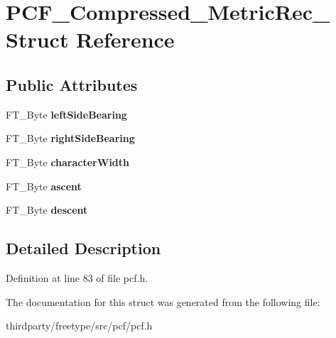 \hypertarget{struct_p_c_f___compressed___metric_rec__}{}\section{P\+C\+F\+\_\+\+Compressed\+\_\+\+Metric\+Rec\+\_\+ Struct Reference}
\label{struct_p_c_f___compressed___metric_rec__}
\subsection*{Public Attributes}
\begin{DoxyCompactItemize}
\item 
\mbox{\label{struct_p_c_f___compressed___metric_rec___aa755334ae0a81cf54129fc19af69024e}} 
F\+T\+\_\+\+Byte {\bfseries left\+Side\+Bearing}
\item 
\mbox{\label{struct_p_c_f___compressed___metric_rec___aab4b6fa2533bdb15cb3f44d028eb5ebc}} 
F\+T\+\_\+\+Byte {\bfseries right\+Side\+Bearing}
\item 
\mbox{\label{struct_p_c_f___compressed___metric_rec___a0dedaf11ea8c350f2ecb4e258d9e6769}} 
F\+T\+\_\+\+Byte {\bfseries character\+Width}
\item 
\mbox{\label{struct_p_c_f___compressed___metric_rec___a5bbb3b83ebf608c0e503f4409bf2354b}} 
F\+T\+\_\+\+Byte {\bfseries ascent}
\item 
\mbox{\label{struct_p_c_f___compressed___metric_rec___aaa1d108831def803c4d4dd93f3035512}} 
F\+T\+\_\+\+Byte {\bfseries descent}
\end{DoxyCompactItemize}


\subsection{Detailed Description}


Definition at line 83 of file pcf.\+h.



The documentation for this struct was generated from the following file\+:\begin{DoxyCompactItemize}
\item 
thirdparty/freetype/src/pcf/pcf.\+h\end{DoxyCompactItemize}
